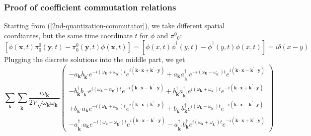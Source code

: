\subsubsection{Proof of coefficient commutation relations}
Starting from (\ref{2nd-quantization-commutator}), we take different spatial coordiantes, but the same time coordinate $t$ for $\phi$ and $\pi^0{ }_0$:
\begin{equation}
\left[\phi(\mathbf{x}, t) \pi_{0}^{0}(\mathbf{y}, t)-\pi_{0}^{0}(\mathbf{y}, t) \phi(\mathbf{x}, t)\right]=\left[ \phi(x, t) \dot{\phi}^{\dagger}(y, t)-\dot{\phi}^{\dagger}(y, t) \phi(x, t)\right]=i \delta(x-y)
\label{2nd-quantization-commutator-same-t}
\end{equation}
Plugging the discrete solutions into the middle part, we get
$$
\sum_{\mathbf{k}} \sum_{\mathbf{k}^{\prime}} \frac{i \omega_{\mathbf{k}}}{2 V \sqrt{\omega_{\mathbf{k}} \omega_{\mathbf{k}}}}\left(\begin{array}{c}
     -a_{\mathbf{k}} b_{\mathbf{k}^{\prime}} e^{-i\left(\omega_{\mathbf{k}}+\omega_{\mathbf{k}^{\prime}}\right) t} e^{i\left(\mathbf{k} \cdot \mathbf{x}+\mathbf{k}^{\prime} \cdot \mathbf{y}\right)}+a_{\mathbf{k}} a_{\mathbf{k}^{\prime}}^{\dagger} e^{-i\left(\omega_{\mathbf{k}}-\omega_{\mathbf{k}^{\prime}}\right) t} e^{i\left(\mathbf{k} \cdot \mathbf{x}-\mathbf{k}^{\prime} \cdot \mathbf{y}\right)}\\
     -b_{\mathbf{k}}^{\dagger} b_{\mathbf{k}^{\prime}} e^{i\left(\omega_{\mathbf{k}}-\alpha_{\mathbf{k}^{\prime}}\right) t} e^{-i\left(\mathbf{k} \cdot \mathbf{x}-\mathbf{k}^{\prime} \cdot \mathbf{y}\right)}+b_{\mathbf{k}}^{\dagger} a_{\mathbf{k}^{\prime}}^{\dagger} e^{i\left(\omega_{\mathbf{k}}+\omega_{\mathbf{k}^{\prime}}\right) t} e^{-i\left(\mathbf{k} \cdot \mathbf{x}+\mathbf{k}^{\prime} \cdot \mathbf{y}\right)}\\ 
     +b_{\mathbf{k}^{\prime}} a_{\mathbf{k}} e^{-i\left(\omega_{\mathbf{k}}+\omega_{\mathbf{k}^{\prime}}\right) t} e^{i\left(\mathbf{k} \cdot \mathbf{x}+\mathbf{k}^{\prime} \cdot \mathbf{y}\right)}+b_{\mathbf{k}^{\prime}} b_{\mathbf{k}}^{\dagger} e^{i\left(\omega_{\mathbf{k}}-\omega_{\mathbf{k}^{\prime}}\right) t} e^{-i\left(\mathbf{k} \cdot \mathbf{x}-\mathbf{k}^{\prime} \cdot \mathbf{y}\right)}\\
     -a_{\mathbf{k}^{\prime}}^{\dagger} a_{\mathbf{k}} e^{-i\left(\omega_{\mathbf{k}}-\omega_{\mathbf{k}^{\prime}}\right) t} e^{i\left(\mathbf{k} \cdot \mathbf{x}-\mathbf{k}^{\prime} \cdot \mathbf{y}\right)}-a_{\mathbf{k}^{\prime}}^{\dagger} b_{\mathbf{k}}^{\dagger} e^{i\left(\omega_{\mathbf{k}}+\omega_{\mathbf{k}^{\prime}}\right) t} e^{-i\left(\mathbf{k} \cdot \mathbf{x}+\mathbf{k}^{\prime} \cdot \mathbf{y}\right)}
\end{array}\right)
$$
